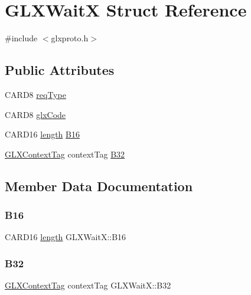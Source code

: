 \hypertarget{struct_g_l_x_wait_x}{}\section{G\+L\+X\+WaitX Struct Reference}
\label{struct_g_l_x_wait_x}


{\ttfamily \#include $<$glxproto.\+h$>$}

\subsection*{Public Attributes}
\begin{DoxyCompactItemize}
\item 
C\+A\+R\+D8 \hyperlink{struct_g_l_x_wait_x_ad11b3b26e66094e37c4d41d280e6d7b9}{req\+Type}
\item 
C\+A\+R\+D8 \hyperlink{struct_g_l_x_wait_x_ad4d5e935ebb8bb3a8ecaff0ec47f88bc}{glx\+Code}
\item 
C\+A\+R\+D16 \hyperlink{glcorearb_8h_ab9c919755bde3b34349e23a32b4e0fa7}{length} \hyperlink{struct_g_l_x_wait_x_a295c919a269e3ec2c28e253398adfde9}{B16}
\item 
\hyperlink{glxproto_8h_ae71763ce00c9fa460beb4699af678691}{G\+L\+X\+Context\+Tag} context\+Tag \hyperlink{struct_g_l_x_wait_x_a9f6036b17b3dc048ad227268b58fc62b}{B32}
\end{DoxyCompactItemize}


\subsection{Member Data Documentation}
\mbox{\label{struct_g_l_x_wait_x_a295c919a269e3ec2c28e253398adfde9}} 
\subsubsection{\texorpdfstring{B16}{B16}}
{\footnotesize\ttfamily C\+A\+R\+D16 \hyperlink{glcorearb_8h_ab9c919755bde3b34349e23a32b4e0fa7}{length} G\+L\+X\+Wait\+X\+::\+B16}

\mbox{\label{struct_g_l_x_wait_x_a9f6036b17b3dc048ad227268b58fc62b}} 
\subsubsection{\texorpdfstring{B32}{B32}}
{\footnotesize\ttfamily \hyperlink{glxproto_8h_ae71763ce00c9fa460beb4699af678691}{G\+L\+X\+Context\+Tag} context\+Tag G\+L\+X\+Wait\+X\+::\+B32}

